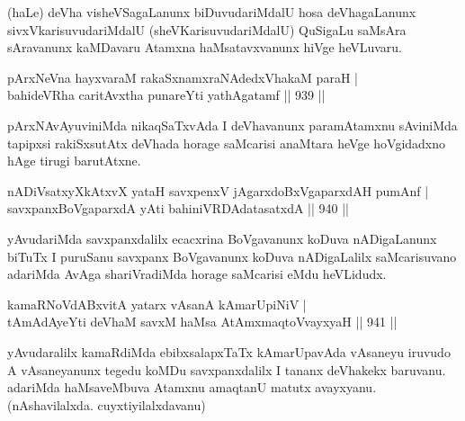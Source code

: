 \begin{artha}
(haLe) deVha visheVSagaLanunx biDuvudariMdalU hosa deVhagaLanunx sivxVkarisuvudariMdalU (sheVKarisuvudariMdalU) QuSigaLu saMsAra sAravanunx kaMDavaru Atamxna haMsatavxvanunx hiVge heVLuvaru.
\end{artha}


\begin{shl}
pArxNeVna hayxvaraM rakaSxnamxraNAdedxVhakaM paraH | \\
bahideVRha caritAvx\s tha punareYti yathAgatamf \hfill||  939 ||  
\end{shl}

\begin{artha}
pArxNAvAyuviniMda nikaqSaTxvAda I deVhavanunx paramAtamxnu sAviniMda tapipxsi rakiSxsutAtx deVhada horage saMcarisi anaMtara heVge hoVgidadxno hAge tirugi barutAtxne.
\end{artha}


\begin{shl}
nADiVsatxyXkAtxvX yataH savxpenxV jAgarxdoBxVgaparxdAH pumAnf | \\
savxpanxBoVgaparxdA yAti bahiniVRDAdatasatxdA \hfill||  940 ||  
\end{shl}

\begin{artha}
yAvudariMda savxpanxdalilx ecacxrina BoVgavanunx koDuva nADigaLanunx biTuTx I puruSanu savxpanx BoVgavanunx koDuva nADigaLalilx saMcarisuvano adariMda AvAga shariVradiMda horage saMcarisi eMdu heVLidudx.
\end{artha}

\begin{shl}
kamaRNoVdABxvitA yatarx vAsanA kAmarUpiNiV | \\
tAmAdAyeYti deVhaM savxM haMsa AtAmx\s maqtoV\s vayxyaH \hfill||  941 ||  
\end{shl}

\begin{artha}
yAvudaralilx kamaRdiMda ebibxsalapxTaTx kAmarUpavAda vAsaneyu iruvudo A vAsaneyanunx tegedu koMDu savxpanxdalilx I tananx deVhakekx baruvanu. adariMda haMsaveMbuva Atamxnu amaqtanU matutx avayxyanu. (nAshavilalxda. cuyxtiyilalxdavanu)
\end{artha}

